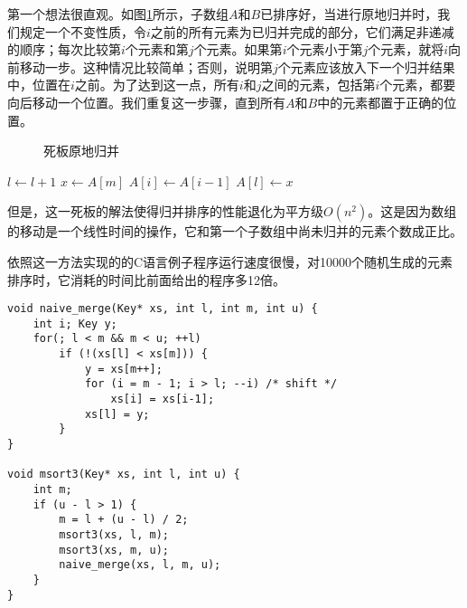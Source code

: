 \documentclass[UTF8]{article}
\begin{document}
第一个想法很直观。如图\ref{fig:merge-in-place-naive}所示，子数组$A$和$B$已排序好，当进行原地归并时，我们规定一个不变性质，令$i$之前的所有元素为已归并完成的部分，它们满足非递减的顺序；每次比较第$i$个元素和第$j$个元素。如果第$i$个元素小于第$j$个元素，就将$i$向前移动一步。这种情况比较简单；否则，说明第$j$个元素应该放入下一个归并结果中，位置在$i$之前。为了达到这一点，所有$i$和$j$之间的元素，包括第$i$个元素，都要向后移动一个位置。我们重复这一步骤，直到所有$A$和$B$中的元素都置于正确的位置。

\begin{figure}[htbp]
 \centering
 \caption{死板原地归并}
 \label{fig:merge-in-place-naive}
\end{figure}

\begin{algorithmic}[1]
      \State $l \gets l + 1$
    \Else
      \State $x \gets A[m]$
       
        \State $A[i] \gets A[i-1]$
      \EndFor
      \State $A[l] \gets x$
    \EndIf
  \EndWhile
\EndProcedure
\end{algorithmic}

但是，这一死板的解法使得归并排序的性能退化为平方级$O(n^2)$。这是因为数组的移动是一个线性时间的操作，它和第一个子数组中尚未归并的元素个数成正比。

依照这一方法实现的的C语言例子程序运行速度很慢，对10000个随机生成的元素排序时，它消耗的时间比前面给出的程序多12倍。

\lstset{language=C}
\begin{lstlisting}
void naive_merge(Key* xs, int l, int m, int u) {
    int i; Key y;
    for(; l < m && m < u; ++l)
        if (!(xs[l] < xs[m])) {
            y = xs[m++];
            for (i = m - 1; i > l; --i) /* shift */
                xs[i] = xs[i-1];
            xs[l] = y;
        }
}

void msort3(Key* xs, int l, int u) {
    int m;
    if (u - l > 1) {
        m = l + (u - l) / 2;
        msort3(xs, l, m);
        msort3(xs, m, u);
        naive_merge(xs, l, m, u);
    }
}
\end{lstlisting}
\end{document}
